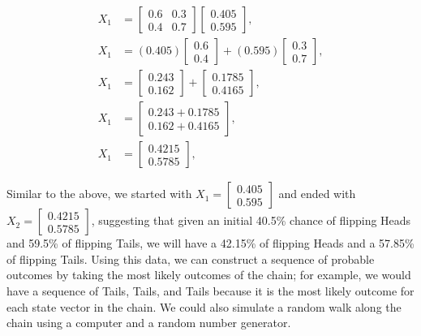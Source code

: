 \documentclass[12pt,final]{article}
\begin{document}
\begin{subequations}
\begin{align}
  X_1 &= \begin{bmatrix}
    0.6 & 0.3 \\
    0.4 & 0.7
  \end{bmatrix}
  \begin{bmatrix}
    0.405 \\
    0.595
  \end{bmatrix}, \\
  X_1 &= (0.405)\begin{bmatrix}
    0.6 \\
    0.4
  \end{bmatrix} +
  (0.595)\begin{bmatrix}
    0.3 \\
    0.7
  \end{bmatrix}, \\
  X_1 &= \begin{bmatrix}
    0.243 \\
    0.162
  \end{bmatrix} +
  \begin{bmatrix}
    0.1785 \\
    0.4165
  \end{bmatrix}, \\
  X_1 &= \begin{bmatrix}
    0.243 + 0.1785 \\
    0.162 + 0.4165
  \end{bmatrix}, \\
    X_1 &= \begin{bmatrix}
      0.4215 \\
      0.5785
  \end{bmatrix},
\end{align}
\label{eq:markovequationweightedcointosssolutionx2}
\end{subequations}

Similar to the above, we started with $X_1 = \begin{bmatrix} 0.405 \\ 0.595 \end{bmatrix}$ and
ended with $X_2 = \begin{bmatrix} 0.4215 \\ 0.5785 \end{bmatrix}$, suggesting that given an
initial 40.5\% chance of flipping Heads and 59.5\% of flipping Tails, we will have a 42.15\% of
flipping Heads and a 57.85\% of flipping Tails. Using this data, we can construct a sequence of
probable outcomes by taking the most likely outcomes of the chain; for example, we would have a
sequence of Tails, Tails, and Tails because it is the most likely outcome for each state vector
in the chain. We could also simulate a random walk along the chain using a computer and a random
number generator.
\end{document}
